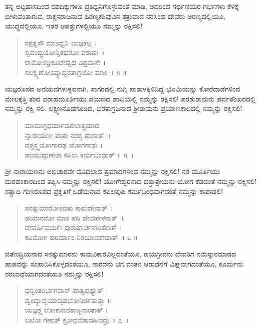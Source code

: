 ತನ್ನ ಅಟ್ಟಹಾಸದಿಂದ ದಶದಿಕ್ಕುಗಳೂ ಪ್ರತಿಧ್ವನಿಗೊಳ್ಳುವಂತೆ ಮಾಡಿ, ಅದರಿಂದ ಗರ್ಭಿಣಿಯರ ಗರ್ಭಗಳು ಕೆಳಕ್ಕೆ ಬೀಳುವಂತಾಗುವ, ರಾಕ್ಷಸರಾಜನಾದ ಹಿರಣ್ಯಕಶಿಪುವಿನ ಶತ್ರುವಾದ ನರಸಿಂಹ ದೇವರು ಅರಣ್ಯದಲ್ಲಿಯೂ, ಯುದ್ಧದಲ್ಲಿಯೂ, ಇತರ ಆಪತ್ತುಗಳಲ್ಲಿಯೂ ನಮ್ಮನ್ನು ರಕ್ಷಿಸಲಿ!

\begin{verse}
ರಕ್ಷತ್ವಸೌ ಮಾಽಧ್ವನಿ ಯಜ್ಞಕಲ್ಪ ।\\ಸ್ವದಂಷ್ಟ್ರಯೋನ್ನಿತಧರೋ ವರಾಹಃ ॥\\ರಾಮೋಽದ್ರಿಕೂಟೇಷ್ವಥ ವಿಪ್ರವಾಸೇ ।\\ಸಲಕ್ಷ್ಮಣೋಽವ್ಯಾದ್ಭರತಾಗ್ರಜೋ ಮಾಂ \num{॥ ೪ ॥}
\end{verse}

ಯಜ್ಞರೂಪದ ಅವಯವಗಳುಳ್ಳವನಾಗಿ, ಸಾಗರದಲ್ಲಿ ನುಗ್ಗಿ ಪಾತಾಳಕ್ಕಿಳಿದಿದ್ದ ಭೂಮಿಯನ್ನು ಕೋರೆದಾಡೆಗಳಿಂದ ಮೇಲಕ್ಕೆತ್ತಿ ತಂದ ವರಾಹಮೂರ್ತಿಯು ಪಯಣದ ಹಾದಿಯಲ್ಲಿ ನಮ್ಮನ್ನು ರಕ್ಷಿಸಲಿ! ಪರಶುರಾಮನು ಪರ್ವತಶಿಖರದಲ್ಲಿ ನಮ್ಮನ್ನು ರಕ್ಷಿ ಸಲಿ. ಲಕ್ಷ್ಮಣನೊಡಗೂಡಿದ, ಭರತಾಗ್ರಜನಾದ ಶ್ರೀರಾಮನು ಪ್ರಯಾಣಕಾಲದಲ್ಲಿ ನಮ್ಮನ್ನು ರಕ್ಷಿಸಲಿ!

\begin{verse}
ಮಾಮುಗ್ರಧರ್ಮಾದಖಿಲಾತ್ಪ್ರಮಾದ ।\\ನ್ನಾರಾಯಣಃ ಪಾತು ನರಶ್ಚ ಹಾಸಾತ್ ॥\\ದತ್ತಸ್ತ್ವಯೋಗಾದಥ ಯೋಗನಾಥಃ ।\\ಪಾಯುದ್ಗುಣೇಶಃ ಕಪಿಲಃ ಕರ್ಮಬಂಧಾತ್ \num{॥ ೫ ॥}
\end{verse}

ಶ್ರೀ ನಾರಾಯಣನು ಅಭಿಚಾರವೇ ಮೊದಲಾದ ಪ್ರಮಾದಗಳಿಂದ ನಮ್ಮನ್ನು ರಕ್ಷಿಸಲಿ! ನರ ಮೂರ್ತಿಯು ದುರಹಂಕಾರದಿಂದ ತಪ್ಪಿಸಿ ನಮ್ಮನ್ನು ರಕ್ಷಿಸಲಿ! ಯೋಗೇಶ್ವರನಾದ ದತ್ತಾತ್ರೇಯನು ಯೋಗ ಕೆಡದಂತೆ ನಮ್ಮನ್ನು ರಕ್ಷಿಸಲಿ! ಸತ್ವಾದಿ ಗುಣರೂಪದ ಪ್ರಕೃತಿಗೆ ಒಡೆಯನಾದ ಕಪಿಲಪುಷಿ ಕರ್ಮಬಂಧವಾಗದಂತೆ ನಮ್ಮನ್ನು ಕಾಪಾಡಲಿ!

\begin{verse}
ಸನತ್ಕುಮಾರೋಽವತು ಕಾಮದೇವಾತ್ ।\\ಹಯಾನನೋ ಮಾಂ ಪಥಿ ದೇವಹೇಳನಾತ್ ॥\\ದೇವರ್ಷಿವರ್ಯಃ ಪುರುಷಾರ್ಚನಾಂತರಾತ್ ।\\ಕೂರ್ಮೋ ಹರಿರ್ಮಾಂ ನಿರಯಾದಶೇಷಾತ್ \num{॥ ೬ ॥}
\end{verse}

ಜಿತೇಂದ್ರಿಯನಾದ ಸನತ್ಕುಮಾರನು ಕಾಮವಿಕಾರವಿಲ್ಲದಂತೆಯೂ, ಹಯಗ್ರೀವನು ದೇವರಿಗೆ ನಮಸ್ಕಾರಮಾಡದ ಪಾಪವನ್ನು ಸಂಪಾದಿಸಿಕೊಳ್ಳದಂತೆಯೂ, ನಾರದನು ಭಗ ವಂತನ ಆರಾಧನೆಗೆ ವಿಘ್ನವಾಗದಂತೆಯೂ, ಕೂರ್ಮನು ನರಬಾಧೆಯಾಗದಂತೆಯೂ ನಮ್ಮನ್ನು ರಕ್ಷಿಸಲಿ!

\begin{verse}
ಧನ್ವಂತರಿರ್ಭಗವಾನ್ ಪಾತ್ವಪಥ್ಯಾತ್ ।\\ದ್ವಂದ್ವಾದ್ಭಯಾದೃಷಭೋನಿರ್ಜಿತಾತ್ಮಾ ॥\\ಯಜ್ಞಶ್ಚ ಲೋಕಾದವತಾಜ್ಜನಾಂತಾತ್ ।\\ಬಲೋ ಗಣಾತ್ ಕ್ರೋಧವಶಾದಹೀಂದ್ರಃ \num{॥ ೭ ॥}
\end{verse}

